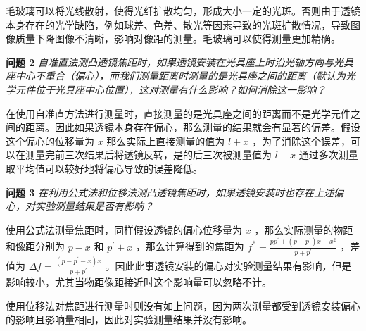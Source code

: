 \documentclass[10pt,a4paper]{article}	%
\begin{document}
	毛玻璃可以将光线散射，使得光纤扩散均匀，形成大小一定的光斑。否则由于透镜本身存在的光学缺陷，例如球差、色差、散光等因素导致的光斑扩散情况，导致图像质量下降图像不清晰，影响对像距的测量。毛玻璃可以使得测量更加精确。

	\textbf {问题 2}\textsl{ 自准直法测凸透镜焦距时，如果透镜安装在光具座上时沿光轴方向与光具座中心不重合（偏心），而我们测量距离时测量的是光具座之间的距离（默认为光学元件位于光具座中心位置），这对测量有什么影响？如何消除这一影响？}

	在使用自准直方法进行测量时，直接测量的是光具座之间的距离而不是光学元件之间的距离。因此如果透镜本身存在偏心，那么测量的结果就会有显著的偏差。假设这个偏心的位移量为 $x$ 那么实际上直接测量的值为 $l + x$ ，为了消除这个误差，可以在测量完前三次结果后将透镜反转，是的后三次被测量值为 $l - x$ 通过多次测量取平均值可以较好地将偏心导致的误差降低。

	\textbf {问题 3}\textsl{ 在利用公式法和位移法测凸透镜焦距时，如果透镜安装时也存在上述偏心，对实验测量结果是否有影响？}

	使用公式法测量焦距时，同样假设透镜的偏心位移量为 $x$ ，那么实际测量的物距和像距分别为 $p - x$ 和 $p^\prime + x$ ，那么计算得到的焦距为 $f^\ast = \frac{pp^\prime + (p-p^\prime)x - x ^ 2}{p + p ^ \prime}$ ，差值为 $\Delta f = \frac{(p-p^\prime - x)x}{p + p ^ \prime}$ 。因此此事透镜安装的偏心对实验测量结果有影响，但是影响较小，尤其当物距像距接近时这个影响量可以忽略不计。

	使用位移法对焦距进行测量时则没有如上问题，因为两次测量都受到透镜安装偏心的影响且影响量相同，因此对实验测量结果并没有影响。
\end{document}
